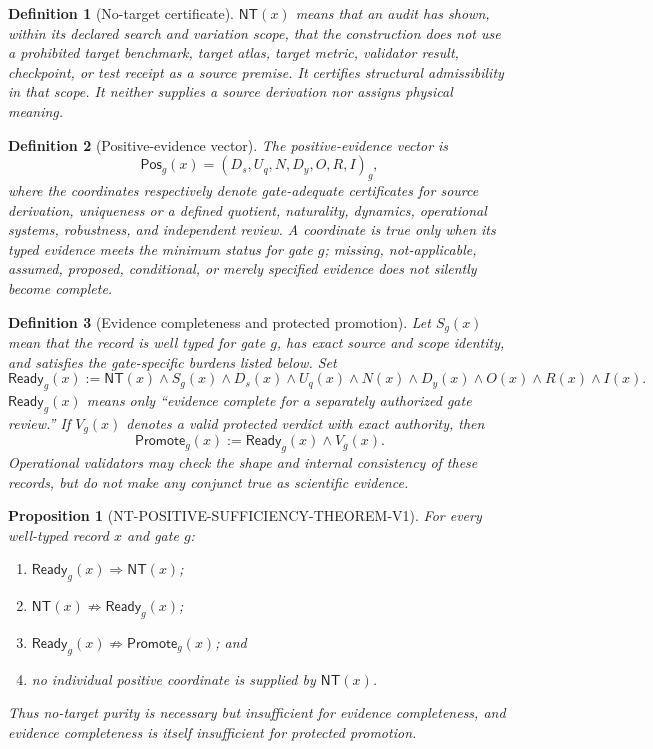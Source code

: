 \documentclass[11pt]{article}
\newtheorem{definition}{Definition}
\newtheorem{proposition}{Proposition}
\newcommand{\NT}{\mathsf{NT}}
\newcommand{\Ready}{\mathsf{Ready}}
\newcommand{\Promote}{\mathsf{Promote}}
\newcommand{\Pos}{\mathsf{Pos}}
\begin{document}
\begin{definition}[No-target certificate]
$\NT(x)$ means that an audit has shown, within its declared search and
variation scope, that the construction does not use a prohibited target
benchmark, target atlas, target metric, validator result, checkpoint, or test
receipt as a source premise.  It certifies structural admissibility in that
scope.  It neither supplies a source derivation nor assigns physical meaning.
\end{definition}

\begin{definition}[Positive-evidence vector]
The positive-evidence vector is
\[
 \Pos_g(x)=(D_s,U_q,N,D_y,O,R,I)_g,
\]
where the coordinates respectively denote gate-adequate certificates for
source derivation, uniqueness or a defined quotient, naturality, dynamics,
operational systems, robustness, and independent review.  A coordinate is true
only when its typed evidence meets the minimum status for gate $g$; missing,
not-applicable, assumed, proposed, conditional, or merely specified evidence
does not silently become complete.
\end{definition}

\begin{definition}[Evidence completeness and protected promotion]
Let $S_g(x)$ mean that the record is well typed for gate $g$, has exact source
and scope identity, and satisfies the gate-specific burdens listed below.  Set
\[
 \Ready_g(x) := \NT(x)\wedge S_g(x)\wedge
 D_s(x)\wedge U_q(x)\wedge N(x)\wedge D_y(x)\wedge
 O(x)\wedge R(x)\wedge I(x).
\]
$\Ready_g(x)$ means only ``evidence complete for a separately authorized gate
review.''  If $V_g(x)$ denotes a valid protected verdict with exact authority,
then
\[
 \Promote_g(x) := \Ready_g(x)\wedge V_g(x).
\]
Operational validators may check the shape and internal consistency of these
records, but do not make any conjunct true as scientific evidence.
\end{definition}

\begin{proposition}[NT-POSITIVE-SUFFICIENCY-THEOREM-V1]
For every well-typed record $x$ and gate $g$:
\begin{enumerate}
  \item $\Ready_g(x)\Rightarrow\NT(x)$;
  \item $\NT(x)\not\Rightarrow\Ready_g(x)$;
  \item $\Ready_g(x)\not\Rightarrow\Promote_g(x)$; and
  \item no individual positive coordinate is supplied by $\NT(x)$.
\end{enumerate}
Thus no-target purity is necessary but insufficient for evidence completeness,
and evidence completeness is itself insufficient for protected promotion.
\end{proposition}
\end{document}
